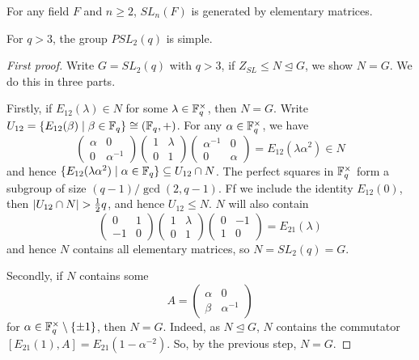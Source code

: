 \documentclass{article}
\begin{document}
\begin{corollary}
    For any field $F$ and $n\geq 2$,  $SL_n(F)$ is generated by elementary matrices.
\end{corollary}

\begin{theorem}
    For $q > 3$, the group $PSL_2(q)$ is simple.
    \begin{proof}[First proof]
        Write $G=SL_2(q)$ with $q>3$, if $Z_{SL}\leq N \unlhd G$, we show $N=G$. We do this in three parts.

        Firstly, if $E_{12}(\lambda)\in N$ for some $\lambda \in \mathbb{F}_q^\times$, then $N=G$. Write $U_{12} = \{E_{12}(\beta)\mid \beta \in \mathbb{F}_q\}\cong(\mathbb{F}_q,+)$. For any $\alpha \in \mathbb{F}_q^\times$, we have \[
        \begin{pmatrix}
            \alpha & 0 \\ 0 & \alpha^{-1}
        \end{pmatrix}\begin{pmatrix}
            1 & \lambda \\ 0 & 1
        \end{pmatrix}\begin{pmatrix}
            \alpha^{-1} & 0 \\ 0 & \alpha
        \end{pmatrix} = E_{12}(\lambda\alpha^2)\in N
        \] and hence $\{E_{12}(\lambda\alpha^2) \mid \alpha\in \mathbb{F}_q\}\subseteq U_{12}\cap N$. The perfect squares in $\mathbb{F}_q^\times$ form a subgroup of size $(q-1)/\gcd(2,q-1)$. Ff we include the identity $E_{12}(0)$, then $\left| U_{12}\cap N \right| > \frac{1}{2}q$, and hence $U_{12}\leq N$. $N$ will also contain \[
        \begin{pmatrix}
            0 & 1 \\ -1 & 0
        \end{pmatrix}\begin{pmatrix}
            1 & \lambda \\ 0 & 1
        \end{pmatrix}\begin{pmatrix}
            0 & -1 \\ 1 & 0
        \end{pmatrix} = E_{21}(\lambda)
        \] and hence $N$ contains all elementary matrices, so $N=SL_2(q)=G$.

        Secondly, if $N$ contains some \[
        A = \begin{pmatrix}
            \alpha & 0 \\ \beta & \alpha^{-1}
        \end{pmatrix}
        \] for $\alpha\in \mathbb{F}_q^\times\setminus\{\pm1\}$, then $N=G$. Indeed, as $N\unlhd G$, $N$ contains the commutator $[E_{21}(1),A] = E_{21}(1-\alpha^{-2})$. So, by the previous step, $N=G$.


\end{proof}
\end{theorem}
\end{document}

